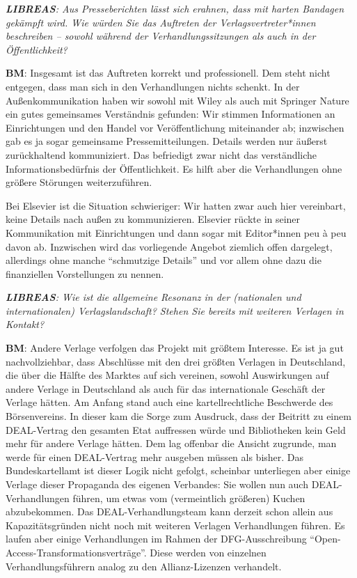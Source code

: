 \documentclass[a4paper,
fontsize=11pt,
oneside,
numbers=noperiodatend,
parskip=half-,
bibliography=totoc,
final
]{scrartcl}
\begin{document}
\emph{\textbf{LIBREAS}: Aus Presseberichten lässt sich erahnen, dass mit
harten Bandagen gekämpft wird. Wie würden Sie das Auftreten der
Verlagsvertreter*innen beschreiben -- sowohl während der
Verhandlungssitzungen als auch in der Öffentlichkeit?}

\textbf{BM}: Insgesamt ist das Auftreten korrekt und professionell. Dem
steht nicht entgegen, dass man sich in den Verhandlungen nichts schenkt.
In der Außenkommunikation haben wir sowohl mit Wiley als auch mit
Springer Nature ein gutes gemeinsames Verständnis gefunden: Wir stimmen
Informationen an Einrichtungen und den Handel vor Veröffentlichung
miteinander ab; inzwischen gab es ja sogar gemeinsame
Pressemitteilungen. Details werden nur äußerst zurückhaltend
kommuniziert. Das befriedigt zwar nicht das verständliche
Informationsbedürfnis der Öffentlichkeit. Es hilft aber die
Verhandlungen ohne größere Störungen weiterzuführen.

Bei Elsevier ist die Situation schwieriger: Wir hatten zwar auch hier
vereinbart, keine Details nach außen zu kommunizieren. Elsevier rückte
in seiner Kommunikation mit Einrichtungen und dann sogar mit
Editor*innen peu à peu davon ab. Inzwischen wird das vorliegende Angebot
ziemlich offen dargelegt, allerdings ohne manche \enquote{schmutzige
Details} und vor allem ohne dazu die finanziellen Vorstellungen zu
nennen.

\emph{\textbf{LIBREAS}: Wie ist die allgemeine Resonanz in der
(nationalen und internationalen) Verlagslandschaft? Stehen Sie bereits
mit weiteren Verlagen in Kontakt?}

\textbf{BM}: Andere Verlage verfolgen das Projekt mit größtem Interesse.
Es ist ja gut nachvollziehbar, dass Abschlüsse mit den drei größten
Verlagen in Deutschland, die über die Hälfte des Marktes auf sich
vereinen, sowohl Auswirkungen auf andere Verlage in Deutschland als auch
für das internationale Geschäft der Verlage hätten. Am Anfang stand auch
eine kartellrechtliche Beschwerde des Börsenvereins. In dieser kam die
Sorge zum Ausdruck, dass der Beitritt zu einem DEAL-Vertrag den gesamten
Etat auffressen würde und Bibliotheken kein Geld mehr für andere Verlage
hätten. Dem lag offenbar die Ansicht zugrunde, man werde für einen
DEAL-Vertrag mehr ausgeben müssen als bisher. Das Bundeskartellamt ist
dieser Logik nicht gefolgt, scheinbar unterliegen aber einige Verlage
dieser Propaganda des eigenen Verbandes: Sie wollen nun auch
DEAL-Verhandlungen führen, um etwas vom (vermeintlich größeren) Kuchen
abzubekommen. Das DEAL-Verhandlungsteam kann derzeit schon allein aus
Kapazitätsgründen nicht noch mit weiteren Verlagen Verhandlungen führen.
Es laufen aber einige Verhandlungen im Rahmen der DFG-Ausschreibung
\enquote{Open-Access-Transformationsverträge}. Diese werden von
einzelnen Verhandlungsführern analog zu den Allianz-Lizenzen verhandelt.
\end{document}
